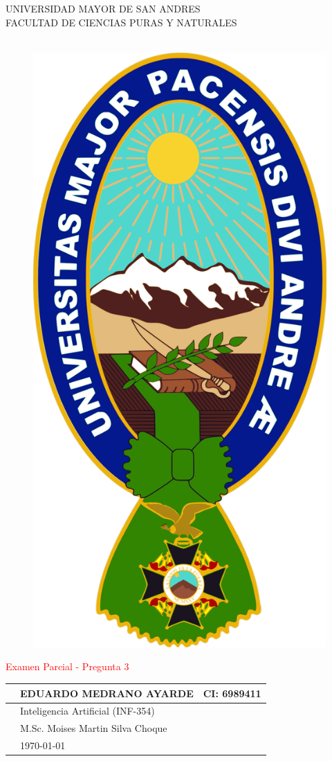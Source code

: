 
	\thispagestyle{empty}
	\begin{center}
		{\fontsize{20}{40}\selectfont UNIVERSIDAD MAYOR DE SAN ANDRES}\\
		\vspace*{0.2cm}
		{\fontsize{16}{32}\selectfont FACULTAD DE CIENCIAS PURAS Y NATURALES}\\
		{\fontsize{14}{28}\selectfont {\it CARRERA DE INFORMÁTICA}}\\
	\end{center}
	\begin{figure}[h]
	\centering
	\includegraphics[width=0.20\linewidth]{im/LOGO}
	\end{figure}
	\begin{center}
		
		
	{\textcolor{red}{\fontsize{24}{0}\selectfont Examen Parcial - Pregunta 3}}\\
	\end{center}
	\hspace*{0.1cm}
	\begin{center}
		\begin{tabular}{r l l}
			\toprule
			{\fontsize{16}{38}\selectfont {\bf Nombres:}} & {\fontsize{14}{38}\selectfont  EDUARDO MEDRANO AYARDE }&CI: 6989411 \\
			 
			
		 
		 
		 \toprule

			 
		 \toprule
			{\fontsize{16}{38}\selectfont {\bf Materia:}} & {\fontsize{14}{38}\selectfont Inteligencia Artificial (INF-354)}\\
			\toprule
			{\fontsize{16}{38}\selectfont {\bf Docente:}} & {\fontsize{14}{38}\selectfont M.Sc. Moises Martin Silva Choque}\\
			\toprule
			{\fontsize{16}{38}\selectfont {\bf Fecha:}} & {\fontsize{14}{38}\selectfont \today}\\
			\bottomrule
		\end{tabular}
	
	\end{center}
		
	
	 
	
	
	
	
